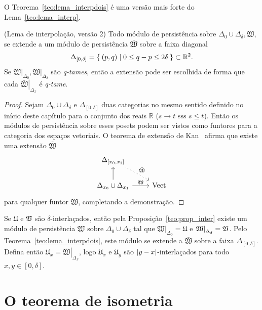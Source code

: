 O Teorema~\ref{teo:lema_interpdois} é uma versão mais forte do 
Lema~\ref{teo:lema_interp}. 
\begin{teo}{(Lema de interpolação, versão 2)}\label{teo:lema_interpdois}
Todo módulo de persistência sobre $\Delta_0 \cup 
\Delta_\delta, \mathfrak{W}$, se extende a um módulo de persistência 
$\bar{\mathfrak{W}}$ sobre a faixa diagonal
\begin{equation*}
    \Delta_{[0, \delta]} = \Set{(p,q) | 0 \leq q - p \leq 2\delta}
    \subset \mathbb{R}^2.
\end{equation*} 
Se $\left.\mathfrak{W}\right|_{\Delta_0}, \left.\mathfrak{W}
\right|_{\Delta_\delta}$ são \textit{q-tames}, então a extensão
pode ser escolhida de forma que cada $\left.\bar{\mathfrak{W}}
\right|_{\Delta_x}$ é \textit{q-tame}. 
\end{teo}
\begin{proof}
    Sejam $\Delta_0 \cup \Delta_\delta$ e $\Delta_{[0,\delta]}$ duas 
    categorias no mesmo sentido definido no início deste capítulo para
    o conjunto dos reais $\mathbb{R}$ ($s \to t \text{ sss } s \leq t$).
    Então os módulos de persistência sobre esses posets podem ser vistos
    como funtores para a categoria dos espaços vetoriais. O teorema
    de extensão de Kan~\cite{MacLane1978} afirma que existe uma extensão
    $\bar{\mathfrak{W}}$ 
    \begin{equation*}
        \begin{tikzcd}
            {\Delta_{[x_0,x_1]}} \arrow[dotted]{rd}{\bar{\mathfrak{W}}}     &             \\
            \Delta_{x_0} \cup \Delta_{x_1} \arrow{u} \arrow{r}{\mathfrak{W}}  & \text{Vect}
        \end{tikzcd}
    \end{equation*}
    para qualquer funtor $\mathfrak{W}$, completando
    a demonstração. 
    
\end{proof}

Se $\mathfrak{U}$ e $\mathfrak{V}$ são $\delta$-interlaçados, então 
pela Proposição~\ref{teo:prop_inter} existe um módulo de 
persistência $\mathfrak{W}$ sobre $\Delta_0 \cup \Delta_\delta$ tal
que $\left.\mathfrak{W}\right|_{\Delta_0} = \mathfrak{U}$ e 
$\left.\mathfrak{W}\right|_{\Delta_\delta} = \mathfrak{V}$. Pelo 
Teorema~\ref{teo:lema_interpdois}, este módulo se extende a 
$\bar{\mathfrak{W}}$ sobre a faixa $\Delta_{[0,\delta]}$.
Defina então $\mathfrak{U}_x = \left.\bar{\mathfrak{W}}\right|_{
\Delta_x}$, logo $\mathfrak{U}_x$ e $\mathfrak{U}_y$ são 
$\left\lvert y-x\right\rvert$-interlaçados para todo $x,y\in [0, \delta]$. 

\section{O teorema de isometria}
